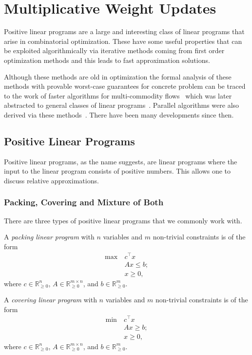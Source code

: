 \chapter{Multiplicative Weight Updates}
Positive linear programs are a large and interesting class of linear programs that arise in combinatorial optimization. These have some useful properties that can be exploited algorithmically via iterative methods coming from first order optimization methods and this leads to fast approximation solutions.

Although these methods are old in optimization the formal analysis of these methods with provable worst-case guarantees for concrete problem can be traced to the work of faster algorithms for multi-commodity flows~\cite{shahrokhi1990maximum} which was later abstracted to general classes of linear programs~\cite{plotkin1995fast,grigoriadis1994fast}. Parallel algorithms were also derived via these methods~\cite{luby1993parallel}. There have been many developments since then.

\section{Positive Linear Programs}
Positive linear programs, as the name suggests, are linear programs where the input to the linear program consists of positive numbers. This allows one to discuss relative approximations.

\subsection{Packing, Covering and Mixture of Both}
There are three types of positive linear programs that we commonly work with.

\begin{definition}\label{def:packing-LP}
	A \emph{packing linear program} with \(n\) variables and \(m\) non-trivial constraints is of the form
	\[
		\begin{aligned}
			\max~ & c^{\top} x  \\
			      & Ax \leq b ; \\
			      & x \geq 0,
		\end{aligned}
	\]
	where \(c \in \mathbb{R} _{\geq 0}^n\), \(A \in \mathbb{R} _{\geq 0}^{m \times n}\), and \(b \in \mathbb{R} _{\geq 0}^m\).
\end{definition}

\begin{definition}\label{def:covering-LP}
	A \emph{covering linear program} with \(n\) variables and \(m\) non-trivial constraints is of the form
	\[
		\begin{aligned}
			\min~ & c^{\top} x  \\
			      & Ax \geq b ; \\
			      & x \geq 0,
		\end{aligned}
	\]
	where \(c \in \mathbb{R} _{\geq 0}^n\), \(A \in \mathbb{R} _{\geq 0}^{m \times n}\), and \(b \in \mathbb{R} _{\geq 0}^m\).
\end{definition}

